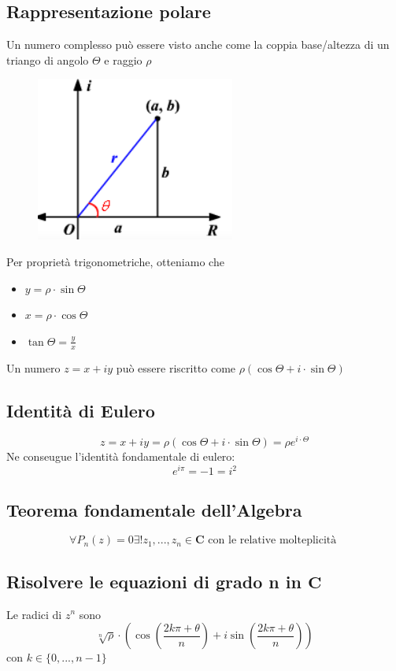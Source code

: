 \documentclass{report}
\begin{document}
    \subsection{Rappresentazione polare}
        Un numero complesso può essere visto anche come la coppia base/altezza di un triango
        di angolo $\Theta$ e raggio $\rho$
        \begin{figure}[H]
            \includegraphics[width=.33\textwidth]{polar.png}
        \end{figure}
        Per proprietà trigonometriche, otteniamo che 
        \begin{itemize}
            \item $y = \rho \cdot \sin\Theta$
            \item $x = \rho \cdot \cos\Theta$
            \item $\tan\Theta = \frac{y}{x}$
        \end{itemize}
        Un numero $z = x + iy$ può essere riscritto come $\rho\left(\cos\Theta + i \cdot \sin\Theta\right)$
    \subsection{Identità di Eulero}
        $$z = x + iy = \rho\left(\cos\Theta + i \cdot \sin\Theta\right) = \rho e^{i \cdot \Theta}$$
        Ne conseugue l'identità fondamentale di eulero: 
        $$e^{i\pi} = -1 = i^2$$
    \subsection{Teorema fondamentale dell'Algebra}
        $$\forall P_n\left(z\right) = 0 \exists! z_1, ..., z_n \in \mathbf{C} 
            \textrm{ con le relative molteplicità }$$
    \subsection{Risolvere le equazioni di grado n in $\mathbf{C}$}
        Le radici di $z^n$ sono 
        $$\sqrt[n]{\rho}\cdot\left(\cos\left(\frac{2k\pi + \theta}{n}\right) + i\sin\left(\frac{2k\pi + \theta}{n}\right)\right)$$
        con $k \in \{0, ..., n-1\}$
\end{document}

